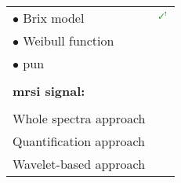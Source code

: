 \begin{table}
\begin{tabular}{l r}
  \quad \quad $\bullet$ Brix model & $^{\text{{\mmarksmall}}}$\cite{Artan2009,Artan2010,Ozer2009,Ozer2010} \cite{Liu2009,Sung2011} \\
  \quad \quad $\bullet$ Weibull function & \cite{Giannini2013,Mazzetti2011,giannini2015fully} \\
  \quad \quad $\bullet$ \acs*{pun} & \cite{Giannini2013,Mazzetti2011,giannini2015fully} \\ \\ [-1.5ex]
  \textbf{\acs*{mrsi} signal:} & \\ \\ [-1.5ex]
  \quad Whole spectra approach & \cite{Kelm2007,Matulewicz2013,Parfait2012,Tiwari2007,Tiwari2008,Tiwari2009,Tiwari2009a,Tiwari2010,Tiwari2013,Viswanath2008} \\
  \quad Quantification approach & \cite{Kelm2007,Parfait2012,trigui2016classification,trigui2017automatic} \\
  \quad Wavelet-based approach & \cite{Tiwari2012} \\
    \bottomrule
    \end{tabular}
  \label{tab:feat}
\end{table}

